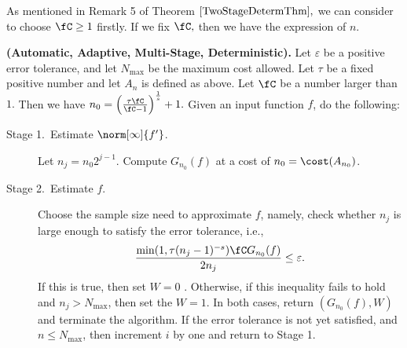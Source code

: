 As mentioned in Remark 5 of Theorem $\ref{TwoStageDetermThm},$ we can consider to choose $\fC \ge 1$ firstly.
If we fix $\fC,$ then we have the expression of $n.$
\begin{algo} 
{\bf (Automatic, Adaptive, Multi-Stage, Deterministic).}
 Let $\varepsilon$ be a positive error tolerance, and let $N_{\max}$ be the maximum cost allowed.  Let $\tau$ be a fixed positive number and
 let $A_{n}$ is defined as above. Let $\fC$ be a number larger than $1.$ Then we have $n_{0}=\left(\frac{\tau \fC}{\fC-1}\right)^{\frac{1}{s}}+1.$ Given an input function $f$, do the following:

\begin{description}
\item[Stage 1.\ Estimate {$\norm[\infty]{f'}$}.] Let $n_{j}=n_{0}2^{j-1}.$ Compute $G_{n_{0}}(f)$ at a cost of $n_{0} = \cost(A_{n_{0}})$.   

\item [Stage 2.\ Estimate {$f$}.] Choose the sample size need to approximate $f$, namely, check whether $n_{j}$ is large enough to satisfy the error tolerance, i.e.,
\[
\frac{\min(1,\tau (n_{j}-1)^{-s})\fC G_{n_{0}}(f)}{2n_{j}} \le \varepsilon.
\]
If this is true, then set $W=0$ .  Otherwise, if this inequality fails to hold and $n_{j} > N_{\max}$, then set the $W=1$.  In both cases, return $(G_{n_{0}}(f),W)$ and terminate the algorithm.  If the error tolerance is not yet satisfied, and $n \le N_{\max}$, then increment $i$ by one and return to Stage 1.

\end{description}

\end{algo}

